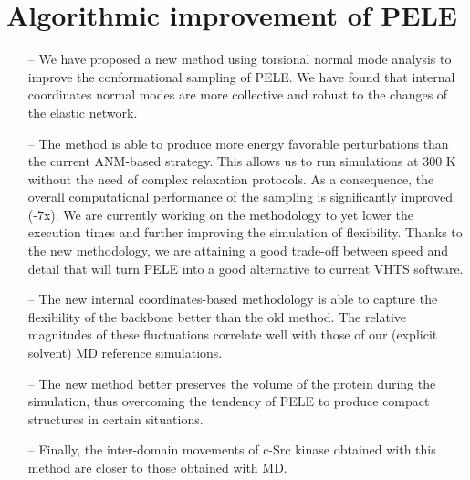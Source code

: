 \section{Algorithmic improvement of PELE}
\begin{itemize}
\item[--] We have proposed a new method using torsional normal mode analysis to improve the conformational sampling of PELE. We have found that internal coordinates normal modes are more collective and robust to the changes of the elastic network.  
\item[--] The method is able to produce more energy favorable perturbations than the current ANM-based strategy. This allows us to run simulations at 300 K without the need of complex relaxation protocols. As a consequence, the overall computational performance of the sampling is significantly improved (-7x). We are currently working on the methodology to yet lower the execution times and further improving the simulation of flexibility. Thanks to the new methodology, we are attaining a good trade-off between speed and detail that will turn PELE into a good alternative to current VHTS software.
\item[--] The new internal coordinates-based methodology is able to capture the flexibility of the backbone better than the old method. The relative magnitudes of these fluctuations correlate well with those of our (explicit solvent) MD reference simulations.
\item[--] The new method better preserves the volume of the protein during the simulation, thus overcoming the tendency of PELE to produce compact structures in certain situations. 
\item[--] Finally, the inter-domain movements of c-Src kinase obtained with this method are closer to those obtained with MD.   
\end{itemize}

